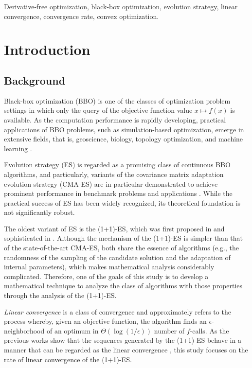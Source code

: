 \documentclass[journal]{IEEEtran}
\theoremstyle{definition}
\begin{document}
\begin{IEEEkeywords}
Derivative-free optimization, black-box optimization, evolution strategy, linear convergence, convergence rate, convex optimization.
\end{IEEEkeywords}

\sloppy


\section{Introduction}
\label{intro}
\subsection{Background}


Black-box optimization (BBO) is one of the classes of optimization problem settings in which only the query of the objective function value $x \mapsto f(x)$ is available.
As the computation performance is rapidly developing, practical applications of BBO problems, such as simulation-based optimization, emerge in extensive fields, that is, geoscience, biology, topology optimization, and machine learning \cite{dong2019efficient, fujii2018cma, kriest2017calibrating, uhlendorf2012long}.

Evolution strategy (ES) is regarded as a promising class of continuous BBO algorithms,
and particularly, variants of the covariance matrix adaptation evolution strategy (CMA-ES)\cite{hansen2014principled,hansen2003reducing,hansen2001completely} are in particular demonstrated to achieve prominent performance in benchmark problems and applications \cite{dong2019efficient, fujii2018cma, kriest2017calibrating, uhlendorf2012long, varelas2018comparative}.
While the practical success of ES has been widely recognized, its theoretical foundation is not significantly robust.

The oldest variant of ES is the (1+1)-ES, which was first proposed in \cite{rechenberg1973evolution} and sophisticated in \cite{kern2004learning}.
Although the mechanism of the (1+1)-ES is simpler than that of the state-of-the-art CMA-ES, both share the essence of algorithms (e.g., the randomness of the sampling of the candidate solution and the adaptation of internal parameters), which makes mathematical analysis considerably complicated.
Therefore, one of the goals of this study is to develop a mathematical technique to analyze the class of algorithms with those properties through the analysis of the (1+1)-ES.

\emph{Linear convergence} is a class of convergence and approximately refers to the process whereby, given an objective function, the algorithm finds an $\epsilon$-neighborhood of an optimum in {$\Theta\left(\log\left(1/\epsilon\right)\right)$} number of $f$-calls.
As the previous works show that the sequences generated by the (1+1)-ES behave in a manner that can be regarded as the linear convergence \cite{akimoto2018drift,akimoto2020global,auger2013linear,jagerskupper2003analysis,jagerskupper20061+,jagerskupper2007algorithmic,morinaga2019generalized},
this study focuses on the rate of linear convergence of the (1+1)-ES.
\end{document}
